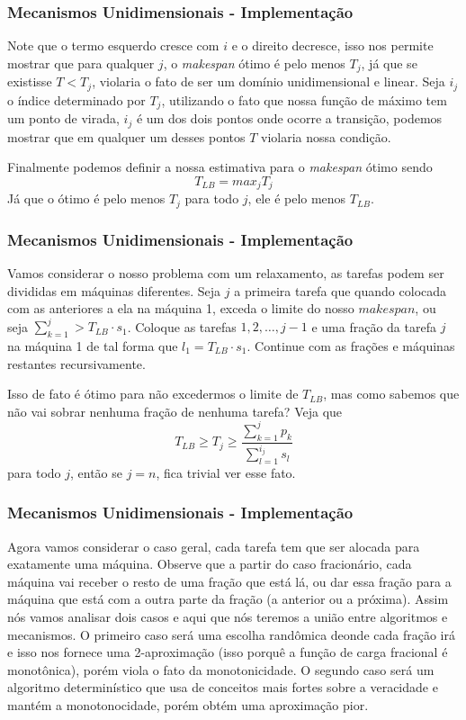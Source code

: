 \documentclass{beamer}
\begin{document}
\begin{frame}
    \frametitle{Mecanismos Unidimensionais - Implementação}
    Note que o termo esquerdo cresce com $i$ e o direito decresce, isso nos permite mostrar que para qualquer $j$, o \textit{makespan} ótimo é pelo menos $T_j$, já que se existisse $T < T_j$, violaria o fato de ser um domínio unidimensional e linear. Seja $i_j$ o índice determinado por $T_j$, utilizando o fato que nossa função de máximo tem um ponto de virada, $i_j$ é um dos dois pontos onde ocorre a transição, podemos mostrar que em qualquer um desses pontos $T$ violaria nossa condição.

    Finalmente podemos definir a nossa estimativa para o \textit{makespan} ótimo sendo
    $$
        T_{LB} = max_j T_j
    $$
    Já que o ótimo é pelo menos $T_j$ para todo $j$, ele é pelo menos $T_{LB}$. 
\end{frame}

\begin{frame}
    \frametitle{Mecanismos Unidimensionais - Implementação}
    Vamos considerar o nosso problema com um relaxamento, as tarefas podem ser divididas em máquinas diferentes. Seja $j$ a primeira tarefa que quando colocada com as anteriores a ela na máquina 1, exceda o limite do nosso $makespan$, ou seja $\sum_{k = 1}^{j} > T_{LB} \cdot s_1$. Coloque as tarefas $1, 2, \ldots, j - 1$ e uma fração da tarefa $j$ na máquina 1 de tal forma que $l_1 = T_{LB} \cdot s_1$. Continue com as frações e máquinas restantes recursivamente. 

    Isso de fato é ótimo para não excedermos o limite de $T_{LB}$, mas como sabemos que não vai sobrar nenhuma fração de nenhuma tarefa? Veja que
    $$
        T_{LB} \geq T_j \geq \frac{\sum_{k = 1}^{j} p_k}{\sum_{l = 1}^{i_j} s_l}
    $$
    para todo $j$, então se $j = n$, fica trivial ver esse fato.
\end{frame}

\begin{frame}
    \frametitle{Mecanismos Unidimensionais - Implementação}
    Agora vamos considerar o caso geral, cada tarefa tem que ser alocada para exatamente uma máquina. Observe que a partir do caso fracionário, cada máquina vai receber o resto de uma fração que está lá, ou dar essa fração para a máquina que está com a outra parte da fração (a anterior ou a próxima). Assim nós vamos analisar dois casos e aqui que nós teremos a união entre algoritmos e mecanismos. O primeiro caso será uma escolha randômica deonde cada fração irá e isso nos fornece uma 2-aproximação (isso porquê a função de carga fracional é monotônica), porém viola o fato da monotonicidade. O segundo caso será um algoritmo determinístico que usa de conceitos mais fortes sobre a veracidade e mantém a monotonocidade, porém obtém uma aproximação pior.
\end{frame}
\end{document}
